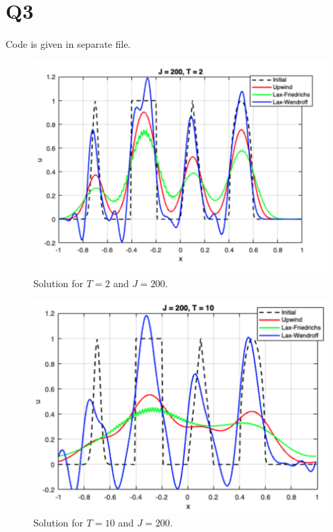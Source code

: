 \pagebreak

\section*{Q3}
\begin{solution}
\hfill\break
Code is given in separate file. 
\begin{figure}[H]
    \centering
    \includegraphics[scale=0.4]{./figures/q3-t2j200.png}
    \caption{Solution for $T = 2$ and $J = 200$.}
\end{figure}
\begin{figure}[H]
    \centering
    \includegraphics[scale=0.4]{./figures/q3-t10j200.png}
    \caption{Solution for $T = 10$ and $J = 200$.}
\end{figure}
\begin{figure}[H]

\end{figure}
\end{solution}
